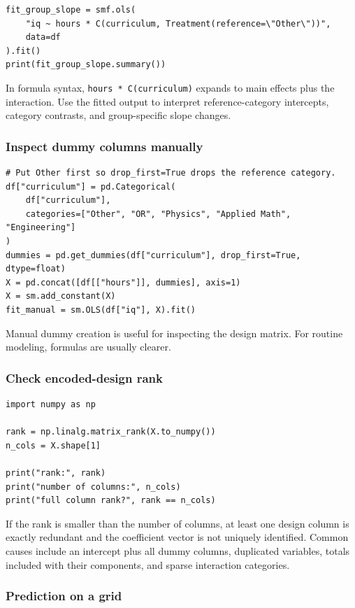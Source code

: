 \begin{verbatim}
fit_group_slope = smf.ols(
    "iq ~ hours * C(curriculum, Treatment(reference=\"Other\"))",
    data=df
).fit()
print(fit_group_slope.summary())
\end{verbatim}

In formula syntax, \texttt{hours * C(curriculum)} expands to main effects plus the interaction.  Use the fitted output to interpret reference-category intercepts, category contrasts, and group-specific slope changes.

\subsubsection*{Inspect dummy columns manually}

\begin{verbatim}
# Put Other first so drop_first=True drops the reference category.
df["curriculum"] = pd.Categorical(
    df["curriculum"],
    categories=["Other", "OR", "Physics", "Applied Math", "Engineering"]
)
dummies = pd.get_dummies(df["curriculum"], drop_first=True, dtype=float)
X = pd.concat([df[["hours"]], dummies], axis=1)
X = sm.add_constant(X)
fit_manual = sm.OLS(df["iq"], X).fit()
\end{verbatim}

Manual dummy creation is useful for inspecting the design matrix.  For routine modeling, formulas are usually clearer.

\subsubsection*{Check encoded-design rank}

\begin{verbatim}
import numpy as np

rank = np.linalg.matrix_rank(X.to_numpy())
n_cols = X.shape[1]

print("rank:", rank)
print("number of columns:", n_cols)
print("full column rank?", rank == n_cols)
\end{verbatim}

If the rank is smaller than the number of columns, at least one design column is exactly redundant and the coefficient vector is not uniquely identified.  Common causes include an intercept plus all dummy columns, duplicated variables, totals included with their components, and sparse interaction categories.

\subsubsection*{Prediction on a grid}

